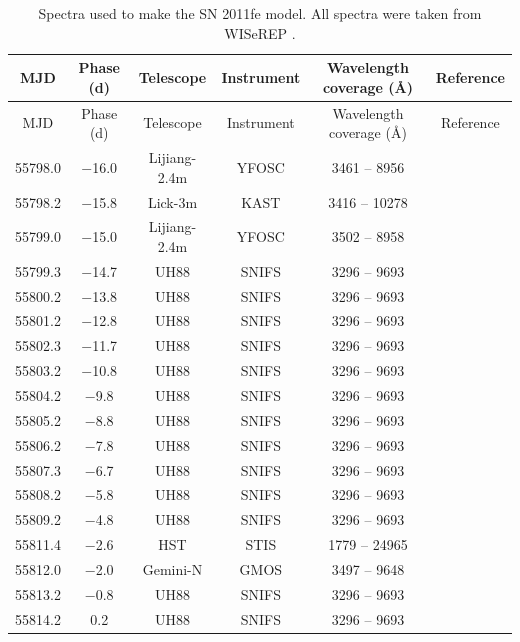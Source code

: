 \documentclass[a4paper,oneside,12pt, class=Latex/Classes/PhDthesisPSnPDF, crop=false]{standalone}
\begin{document}
\tiny
\begin{longtable}{cccccc}
 \caption[List of spectra used in the SN 2011fe model.]{Spectra used to make the SN 2011fe model. All spectra were taken from WISeREP \citep{wiserep}.}
 \label{11fe_sources}
 \endfirsthead
 \hline
 \hline
 MJD  & Phase (d) & Telescope & Instrument & Wavelength coverage (\AA) & Reference    \\
 \hline
 \endhead
 \hline
 \endfoot
 \hline
 \endlastfoot
 \hline
 \hline
 MJD  & Phase (d) & Telescope & Instrument & Wavelength coverage (\AA) & Reference    \\
 \hline
 55798.0 & $-$16.0 & Lijiang-2.4m & YFOSC & 3461 -- 8956 & \citet{spec_Lijiang-2.4m} \\
 55798.2 & $-$15.8 & Lick-3m  & KAST & 3416 -- 10278 & \citet{Nugent_1st_Lick_spec} \\
 55799.0 & $-$15.0 & Lijiang-2.4m & YFOSC & 3502 -- 8958 & \citet{spec_Lijiang-2.4m} \\
 55799.3 & $-$14.7 & UH88   & SNIFS & 3296 -- 9693 & \citet{spec_UH88} \\
 55800.2 & $-$13.8 & UH88   & SNIFS & 3296 -- 9693 & \citet{spec_UH88} \\
 55801.2 & $-$12.8 & UH88   & SNIFS & 3296 -- 9693 & \citet{spec_UH88} \\
 55802.3 & $-$11.7 & UH88   & SNIFS & 3296 -- 9693 & \citet{spec_UH88} \\
 55803.2 & $-$10.8 & UH88   & SNIFS & 3296 -- 9693 & \citet{spec_UH88} \\
 55804.2 & $-$9.8 & UH88   & SNIFS & 3296 -- 9693 & \citet{spec_UH88} \\
 55805.2 & $-$8.8 & UH88   & SNIFS & 3296 -- 9693 & \citet{spec_UH88} \\
 55806.2 & $-$7.8 & UH88   & SNIFS & 3296 -- 9693 & \citet{spec_UH88} \\
 55807.3 & $-$6.7 & UH88   & SNIFS & 3296 -- 9693 & \citet{spec_UH88} \\
 55808.2 & $-$5.8 & UH88   & SNIFS & 3296 -- 9693 & \citet{spec_UH88} \\
 55809.2 & $-$4.8 & UH88   & SNIFS & 3296 -- 9693 & \citet{spec_UH88} \\
 55811.4 & $-$2.6 & HST   & STIS & 1779 -- 24965 & \citet{spec_HST} \\
 55812.0 & $-$2.0 & Gemini-N  & GMOS & 3497 -- 9648 & \citet{spec_Gemini-N} \\
 55813.2 & $-$0.8 & UH88   & SNIFS & 3296 -- 9693 & \citet{spec_UH88} \\
 55814.2 & 0.2 & UH88   & SNIFS & 3296 -- 9693 & \citet{spec_UH88} \\

\end{longtable}
\end{document}
